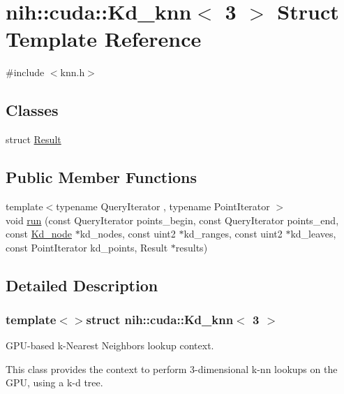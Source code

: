 \hypertarget{structnih_1_1cuda_1_1_kd__knn_3_013_01_4}{
\section{nih\-:\-:cuda\-:\-:\-Kd\-\_\-knn$<$ 3 $>$ \-Struct \-Template \-Reference}
\label{structnih_1_1cuda_1_1_kd__knn_3_013_01_4}
}


{\ttfamily \#include $<$knn.\-h$>$}

\subsection*{\-Classes}
\begin{DoxyCompactItemize}
\item 
struct \hyperlink{structnih_1_1cuda_1_1_kd__knn_3_013_01_4_1_1_result}{\-Result}
\end{DoxyCompactItemize}
\subsection*{\-Public \-Member \-Functions}
\begin{DoxyCompactItemize}
\item 
{\footnotesize template$<$typename Query\-Iterator , typename Point\-Iterator $>$ }\\void \hyperlink{structnih_1_1cuda_1_1_kd__knn_3_013_01_4_a70c1237dd1598e801322c991705f8e35}{run} (const \-Query\-Iterator points\-\_\-begin, const \-Query\-Iterator points\-\_\-end, const \hyperlink{structnih_1_1_kd__node}{\-Kd\-\_\-node} $\ast$kd\-\_\-nodes, const uint2 $\ast$kd\-\_\-ranges, const uint2 $\ast$kd\-\_\-leaves, const \-Point\-Iterator kd\-\_\-points, \-Result $\ast$results)
\end{DoxyCompactItemize}


\subsection{\-Detailed \-Description}
\subsubsection*{template$<$$>$struct nih\-::cuda\-::\-Kd\-\_\-knn$<$ 3 $>$}

\-G\-P\-U-\/based k-\/\-Nearest \-Neighbors lookup context.

\-This class provides the context to perform 3-\/dimensional k-\/nn lookups on the \-G\-P\-U, using a k-\/d tree.

